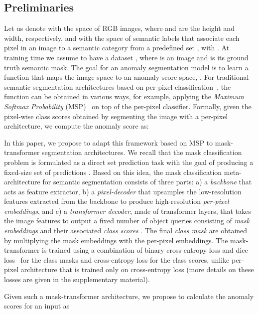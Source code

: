\documentclass[10pt,twocolumn,letterpaper]{article}
\begin{document}
\subsection{Preliminaries}
Let us denote with  the space of RGB images, where  and  are the height and width, respectively, and with  the space of semantic labels that associate each pixel in an image to a semantic category from a predefined set , with . At training time we assume to have a dataset , where   is an image and  is its ground truth semantic mask. 
The goal for an anomaly segmentation model is to learn a function  that maps the image space to an anomaly score space, \ie . For traditional semantic segmentation architectures based on per-pixel classification~\cite{chen2018encoder}, the function  can be obtained in various ways, for example, applying the \textit{Maximum Softmax Probability} (MSP)~\cite{hendrycks2016baseline} on top of the per-pixel classifier. Formally, given the pixel-wise class scores  obtained by segmenting the image  with a per-pixel architecture, we compute the anomaly score as:


In this paper, we propose to adapt this framework based on MSP to mask-transformer segmentation architectures. We recall that the mask classification problem is formulated as a direct set prediction task with the goal of producing a fixed-size set of  predictions \cite{carion2020end}.
Based on this idea, the mask classification meta-architecture for semantic segmentation consists of three parts: a) a \textit{backbone} that acts as feature extractor, b) a \textit{pixel-decoder} that upsamples the low-resolution features extracted from the backbone to produce high-resolution \textit{per-pixel embeddings}, and c) a \textit{transformer decoder}, made of  transformer layers, that takes the image features to output a fixed number of object queries consisting of \textit{mask embeddings} and their associated \textit{class scores} . The final \textit{class mask}  are obtained by multiplying the mask embeddings with the per-pixel embeddings. 
The mask-transformer is trained using a combination of binary cross-entropy loss and dice loss~\cite{milletari2016v} for the class masks and cross-entropy loss for the class scores, unlike per-pixel architecture that is trained only on cross-entropy loss (more details on these losses are given in the supplementary material).

Given such a mask-transformer architecture, we propose to calculate the 
anomaly scores for an input  as 
\end{document}
